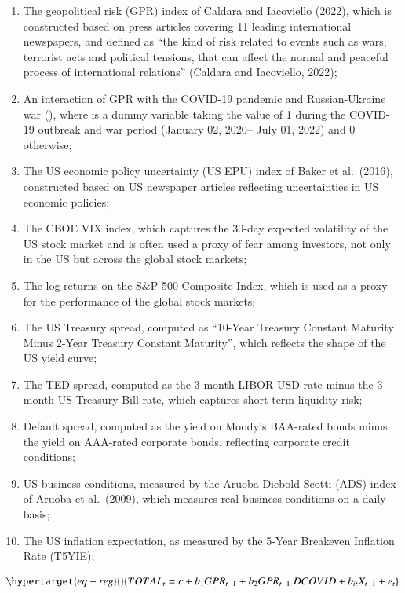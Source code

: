\documentclass[
  number]{elsarticle}
\providecommand{\tightlist}{%
  \setlength{\itemsep}{0pt}\setlength{\parskip}{0pt}}\usepackage{longtable,booktabs,array}
\begin{document}
\begin{enumerate}
\def\labelenumi{\arabic{enumi}.}
\tightlist
\item
  The geopolitical risk (GPR) index of Caldara and Iacoviello (2022),
  which is constructed based on press articles covering 11 leading
  international newspapers, and defined as ``the kind of risk related to
  events such as wars, terrorist acts and political tensions, that can
  affect the normal and peaceful process of international relations''
  (Caldara and Iacoviello, 2022);
\item
  An interaction of GPR with the COVID-19 pandemic and Russian-Ukraine
  war (), where is a dummy variable taking the value of 1 during the
  COVID-19 outbreak and war period (January 02, 2020-- July 01, 2022)
  and 0 otherwise;
\item
  The US economic policy uncertainty (US EPU) index of Baker et
  al.~(2016), constructed based on US newspaper articles reflecting
  uncertainties in US economic policies;
\item
  The CBOE VIX index, which captures the 30-day expected volatility of
  the US stock market and is often used a proxy of fear among investors,
  not only in the US but across the global stock markets;
\item
  The log returns on the S\&P 500 Composite Index, which is used as a
  proxy for the performance of the global stock markets;
\item
  The US Treasury spread, computed as ``10-Year Treasury Constant
  Maturity Minus 2-Year Treasury Constant Maturity'', which reflects the
  shape of the US yield curve;
\item
  The TED spread, computed as the 3-month LIBOR USD rate minus the
  3-month US Treasury Bill rate, which captures short-term liquidity
  risk;
\item
  Default spread, computed as the yield on Moody's BAA-rated bonds minus
  the yield on AAA-rated corporate bonds, reflecting corporate credit
  conditions;
\item
  US business conditions, measured by the Aruoba-Diebold-Scotti (ADS)
  index of Aruoba et al.~(2009), which measures real business conditions
  on a daily basis;
\item
  The US inflation expectation, as measured by the 5-Year Breakeven
  Inflation Rate (T5YIE);
\end{enumerate}

\begin{equation}\protect\hypertarget{eq-reg}{}{TOTAL_t=c+b_1GPR_{t-1}+b_2GPR_{t-1}.DCOVID+b_{it}X_{t-1}+e_t}\label{eq-reg}\end{equation}
\end{document}
